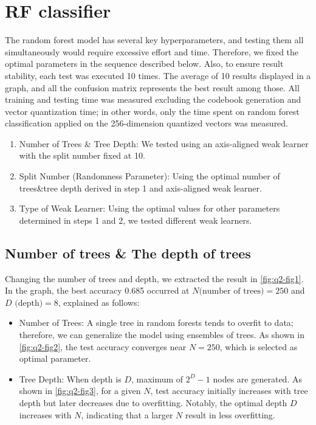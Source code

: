 \section{RF classifier}
\label{sec:intro_q2}

The random forest model has several key hyperparameters, and testing them all simultaneously would require excessive effort and time. Therefore, we fixed the optimal parameters in the sequence described below. Also, to ensure result stability, each test was executed 10 times. The average of 10 results displayed in a graph, and all the confusion matrix represents the best result among those. All training and testing time was measured excluding the codebook generation and vector quantization time; in other words, only the time spent on random forest classification applied on the 256-dimension quantized vectors was measured.
\begin{enumerate}
	\item Number of Trees \& Tree Depth: We tested using an axis-aligned weak learner with the split number fixed at 10.
	\item Split Number (Randomness Parameter): Using the optimal number of trees\&tree depth derived in step 1 and axis-aligned weak learner.
	\item Type of Weak Learner: Using the optimal values for other parameters determined in steps 1 and 2, we tested different weak learners.
\end{enumerate}

\subsection{Number of trees \& The depth of trees}
\label{subsec:Q2_1}
Changing the number of trees and depth, we extracted the result in \cref{fig:q2-fig1}. In the graph, the best accuracy 0.685 occurred at $N \text{(number of trees)} = 250$ and $D\text{ (depth)}=8$, explained as follows:
\begin{itemize}
	\item Number of Trees: A single tree in random forests tends to overfit to data; therefore, we can generalize the model using ensembles of trees. As shown in \cref{fig:q2-fig2}, the test accuracy converges near $N=250$, which is selected as optimal parameter.
	\item Tree Depth: When depth is $D$, maximum of $2^D-1$ nodes are generated. As shown in \cref{fig:q2-fig3}, for a given $N$, test accuracy initially increases with tree depth but later decreases due to overfitting. Notably, the optimal depth $D$ increases with $N$, indicating that a larger $N$ result in less overfitting.
\end{itemize}

